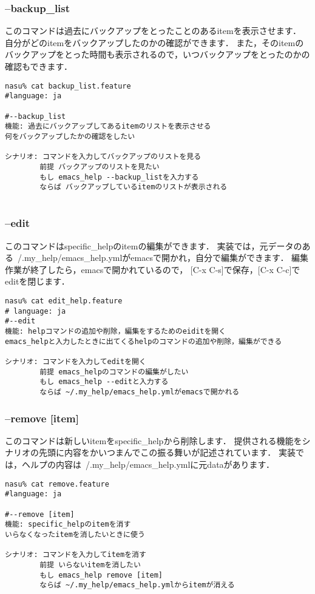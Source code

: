 \subsubsection{--backup\_list}
このコマンドは過去にバックアップをとったことのあるitemを表示させます．
自分がどのitemをバックアップしたのかの確認ができます．
また，そのitemのバックアップをとった時間も表示されるので，いつバックアップをとったのかの確認もできます．
\begin{lstlisting}[style=customRuby,basicstyle={\scriptsize\ttfamily}]
nasu% cat backup_list.feature
#language: ja

#--backup_list
機能: 過去にバックアップしてあるitemのリストを表示させる
何をバックアップしたかの確認をしたい

シナリオ: コマンドを入力してバックアップのリストを見る
        前提 バックアップのリストを見たい
        もし emacs_help --backup_listを入力する
        ならば バックアップしているitemのリストが表示される
        
\end{lstlisting}
\subsubsection{--edit}
このコマンドはspecific\_helpのitemの編集ができます．
実装では，元データのある~/.my\_help/emacs\_help.ymlがemacsで開かれ，自分で編集ができます．
編集作業が終了したら，emacsで開かれているので， [C-x C-s]で保存，[C-x C-c]でeditを閉じます．
\begin{lstlisting}[style=customRuby,basicstyle={\scriptsize\ttfamily}]
nasu% cat edit_help.feature
# language: ja
#--edit
機能: helpコマンドの追加や削除，編集をするためのeiditを開く
emacs_helpと入力したときに出てくるhelpのコマンドの追加や削除，編集ができる

シナリオ: コマンドを入力してeditを開く
        前提 emacs_helpのコマンドの編集がしたい
        もし emacs_help --editと入力する
        ならば ~/.my_help/emacs_help.ymlがemacsで開かれる
\end{lstlisting}
\subsubsection{--remove [item]}
このコマンドは新しいitemをspecific\_helpから削除します．
提供される機能をシナリオの先頭に内容をかいつまんでこの振る舞いが記述されています．
実装では，ヘルプの内容は~/.my\_help/emacs\_help.ymlに元dataがあります．
\begin{lstlisting}[style=customRuby,basicstyle={\scriptsize\ttfamily}]
nasu% cat remove.feature
#language: ja

#--remove [item]
機能: specific_helpのitemを消す
いらなくなったitemを消したいときに使う

シナリオ: コマンドを入力してitemを消す
        前提 いらないitemを消したい
        もし emacs_help remove [item]
        ならば ~/.my_help/emacs_help.ymlからitemが消える

\end{lstlisting}
